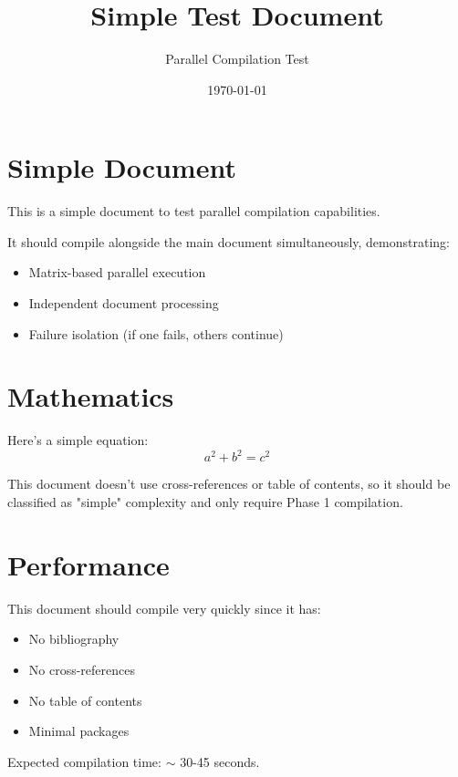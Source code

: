 \documentclass{article}
\title{Simple Test Document}
\author{Parallel Compilation Test}
\date{\today}
\begin{document}
\maketitle

\section{Simple Document}

This is a simple document to test parallel compilation capabilities.

It should compile alongside the main document simultaneously, demonstrating:
\begin{itemize}
    \item Matrix-based parallel execution
    \item Independent document processing
    \item Failure isolation (if one fails, others continue)
\end{itemize}

\section{Mathematics}

Here's a simple equation:
\begin{equation}
    a^2 + b^2 = c^2
\end{equation}

This document doesn't use cross-references or table of contents, so it should be classified as "simple" complexity and only require Phase 1 compilation.

\section{Performance}

This document should compile very quickly since it has:
\begin{itemize}
    \item No bibliography
    \item No cross-references  
    \item No table of contents
    \item Minimal packages
\end{itemize}

Expected compilation time: $\sim$ 30-45 seconds.
\end{document}
